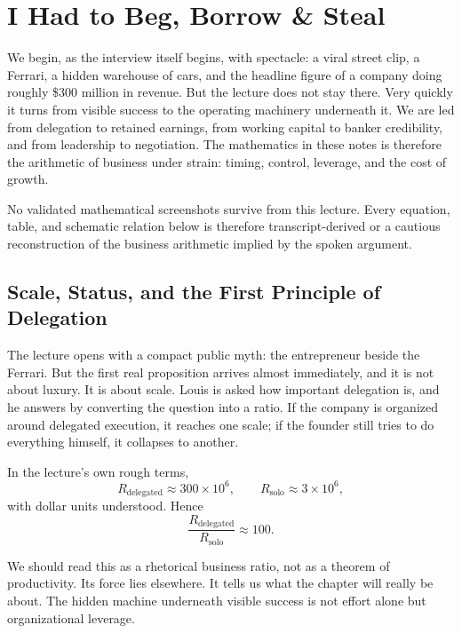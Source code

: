 \chapter{I Had to Beg, Borrow \& Steal}

We begin, as the interview itself begins, with spectacle: a viral street clip, a Ferrari, a hidden warehouse of cars, and the headline figure of a company doing roughly \$300 million in revenue. But the lecture does not stay there. Very quickly it turns from visible success to the operating machinery underneath it. We are led from delegation to retained earnings, from working capital to banker credibility, and from leadership to negotiation. The mathematics in these notes is therefore the arithmetic of business under strain: timing, control, leverage, and the cost of growth.

\begin{remark}
No validated mathematical screenshots survive from this lecture. Every equation, table, and schematic relation below is therefore transcript-derived or a cautious reconstruction of the business arithmetic implied by the spoken argument.
\end{remark}

\section{Scale, Status, and the First Principle of Delegation}

The lecture opens with a compact public myth: the entrepreneur beside the Ferrari. But the first real proposition arrives almost immediately, and it is not about luxury. It is about scale. Louis is asked how important delegation is, and he answers by converting the question into a ratio. If the company is organized around delegated execution, it reaches one scale; if the founder still tries to do everything himself, it collapses to another.

In the lecture's own rough terms,
\begin{equation}
R_{\mathrm{delegated}} \approx 300\times 10^6,
\qquad
R_{\mathrm{solo}} \approx 3\times 10^6,
\end{equation}
with dollar units understood. Hence
\begin{equation}
\frac{R_{\mathrm{delegated}}}{R_{\mathrm{solo}}}\approx 100.
\end{equation}

We should read this as a rhetorical business ratio, not as a theorem of productivity. Its force lies elsewhere. It tells us what the chapter will really be about. The hidden machine underneath visible success is not effort alone but organizational leverage.

